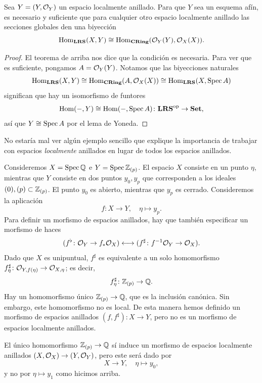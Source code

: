 \documentclass{article}
\numberwithin{equation}{section}
\theoremstyle{definition}
\begin{document}
\begin{corolario}
  Sea $Y = (Y,\mathcal{O}_Y)$ un espacio localmente anillado. Para que $Y$ sea un esquema
  afín, es necesario y suficiente que para cualquier otro espacio localmente
  anillado las secciones globales den una biyección
  $$\operatorname{Hom}_{\text{\bf LRS}} (X, Y) \cong \operatorname{Hom}_{\text{\bf CRing}} (\mathcal{O}_Y (Y), \mathcal{O}_X (X)).$$

  \begin{proof}
    El teorema de arriba nos dice que la condición es necesaria. Para ver que es
    suficiente, pongamos $A = \mathcal{O}_Y (Y)$. Notamos que las biyecciones naturales
    \[ \operatorname{Hom}_{\text{\bf LRS}} (X, Y) \cong
       \operatorname{Hom}_{\text{\bf CRing}} (A, \mathcal{O}_X (X)) \cong
       \operatorname{Hom}_{\text{\bf LRS}} (X, \operatorname{Spec} A) \]
    significan que hay un isomorfismo de funtores
    \[ \operatorname{Hom} (-, Y)\cong \operatorname{Hom} (-, \operatorname{Spec} A)\colon
       \text{\bf LRS}^\mathrm{op} \to \text{\bf Set}, \]
    así que $Y \cong \operatorname{Spec} A$ por el lema de Yoneda.
  \end{proof}
\end{corolario}

\begin{ejemplo}
  No estaría mal ver algún ejemplo sencillo que explique la importancia
  de trabajar con espacios \emph{localmente} anillados en lugar de todos
  los espacios anillados.

  Consideremos $X = \operatorname{Spec} \mathbb{Q}$ e $Y = \operatorname{Spec} \mathbb{Z}_{(p)}$. El espacio $X$ consiste
  en un punto $\eta$, mientras que $Y$ consiste en dos puntos $y_0, y_p$ que
  corresponden a los ideales $(0), (p) \subset \mathbb{Z}_{(p)}$. El punto $y_0$
  es abierto, mientras que $y_p$ es cerrado. Consideremos la aplicación
  $$f\colon X\to Y, \quad \eta \mapsto y_p.$$
  Para definir un morfismo de espacios anillados, hay que también especificar
  un morfismo de haces
  \[ (f^\flat\colon \mathcal{O}_Y \to f_* \mathcal{O}_X) \longleftrightarrow
    (f^\sharp\colon f^{-1} \mathcal{O}_Y \to \mathcal{O}_X). \]
  Dado que $X$ es unipuntual, $f^\sharp$ es equivalente a un solo homomorfismo
  $f^\sharp_\eta\colon \mathcal{O}_{Y, f(\eta)} \to \mathcal{O}_{X,\eta}$; es decir,
  $$f^\sharp_\eta\colon \mathbb{Z}_{(p)} \to \mathbb{Q}.$$
  Hay un homomorfismo único $\mathbb{Z}_{(p)} \to \mathbb{Q}$, que es la inclusión
  canónica. Sin embargo, este homomorfismo no es local. De esta manera hemos
  definido un morfismo de espacios anillados $(f,f^\sharp)\colon X \to Y$, pero
  no es un morfismo de espacios localmente anillados.

  El único homomorfismo $\mathbb{Z}_{(p)} \to \mathbb{Q}$ sí induce un morfismo de espacios
  localmente anillados ${(X,\mathcal{O}_X) \to (Y,\mathcal{O}_Y)}$, pero este será dado por
  $$X\to Y, \quad \eta \mapsto y_0,$$
  y no por $\eta \mapsto y_1$ como hicimos arriba.
\end{ejemplo}
\end{document}
